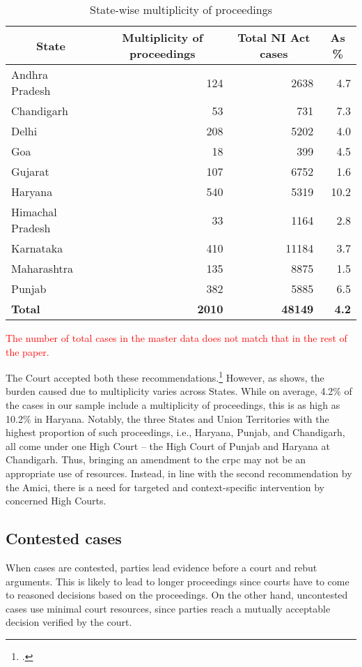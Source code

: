 \begin{longtable}{@{}lrr|r@{}}
\caption{State-wise multiplicity of proceedings}
\label{tab:state_multiplicity} \\
\toprule
\multicolumn{1}{c}{\textbf{State}} & \multicolumn{1}{c}{\textbf{Multiplicity of proceedings}} & \multicolumn{1}{c}{\textbf{Total NI Act cases}} & \multicolumn{1}{|c}{\textbf{As \%}} \\ \midrule
Andhra Pradesh & 124 & 2638 & 4.7 \\
Chandigarh & 53 & 731 & 7.3 \\
Delhi & 208 & 5202 & 4.0 \\
Goa & 18 & 399 & 4.5 \\
Gujarat & 107 & 6752 & 1.6 \\
Haryana & 540 & 5319 & 10.2 \\
Himachal Pradesh & 33 & 1164 & 2.8 \\
Karnataka & 410 & 11184 & 3.7 \\
Maharashtra & 135 & 8875 & 1.5 \\
Punjab & 382 & 5885 & 6.5 \\ \midrule
\textbf{Total} & \textbf{2010} & \textbf{48149} & \textbf{4.2} \\ \bottomrule
\end{longtable}

\textcolor{red}{The number of total cases in the master data does not match that in the rest of the paper.}

The Court accepted both these recommendations.\footcite{sc2020_138} However, as  shows, the burden caused due to multiplicity varies across States. While on average, 4.2\% of the cases in our sample include a multiplicity of proceedings, this is as high as 10.2\% in Haryana. Notably, the three States and Union Territories with the highest proportion of such proceedings, i.e., Haryana, Punjab, and Chandigarh, all come under one High Court -- the High Court of Punjab and Haryana at Chandigarh. Thus, bringing an amendment to the \gls{crpc} may not be an appropriate use of resources. Instead, in line with the second recommendation by the Amici, there is a need for targeted and context-specific intervention by concerned High Courts.   

\subsection{Contested cases}

When cases are contested, parties lead evidence before a court and rebut arguments. This is likely to lead to longer proceedings since courts have to come to reasoned decisions based on the proceedings. On the other hand, uncontested cases use minimal court resources, since parties reach a mutually acceptable decision verified by the court.

